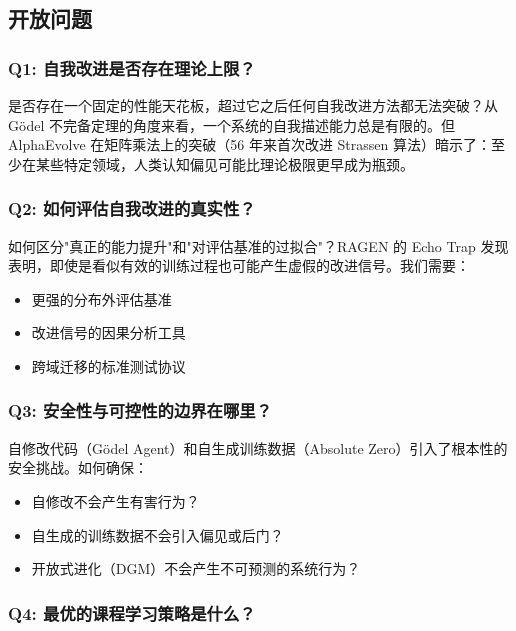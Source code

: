 \subsection{开放问题}\label{sec:open-questions}

\subsubsection{Q1: 自我改进是否存在理论上限？}

是否存在一个固定的性能天花板，超过它之后任何自我改进方法都无法突破？从 Gödel 不完备定理的角度来看，一个系统的自我描述能力总是有限的。但 AlphaEvolve 在矩阵乘法上的突破（56 年来首次改进 Strassen 算法）暗示了：至少在某些特定领域，人类认知偏见可能比理论极限更早成为瓶颈。

\subsubsection{Q2: 如何评估自我改进的真实性？}

如何区分"真正的能力提升"和"对评估基准的过拟合"？RAGEN 的 Echo Trap 发现表明，即使是看似有效的训练过程也可能产生虚假的改进信号。我们需要：
\begin{itemize}
\item 更强的分布外评估基准
\item 改进信号的因果分析工具
\item 跨域迁移的标准测试协议
\end{itemize}

\subsubsection{Q3: 安全性与可控性的边界在哪里？}

自修改代码（Gödel Agent）和自生成训练数据（Absolute Zero）引入了根本性的安全挑战。如何确保：
\begin{itemize}
\item 自修改不会产生有害行为？
\item 自生成的训练数据不会引入偏见或后门？
\item 开放式进化（DGM）不会产生不可预测的系统行为？
\end{itemize}

\subsubsection{Q4: 最优的课程学习策略是什么？}

